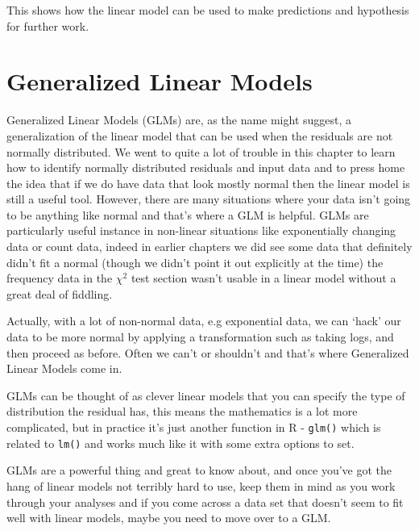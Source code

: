 \documentclass[
]{book}
\newenvironment{sidenote}
{ \begin{tcolorbox}[colbacktitle=blue!50!white,
title=huh?,coltitle=white,
fonttitle=\bfseries] }
{  \end{tcolorbox} }
\begin{document}
This shows how the linear model can be used to make predictions and hypothesis for further work.

\hypertarget{generalized-linear-models}{%
\section{Generalized Linear Models}\label{generalized-linear-models}}

Generalized Linear Models (GLMs) are, as the name might suggest, a generalization of the linear model that can be used when the residuals are not normally distributed. We went to quite a lot of trouble in this chapter to learn how to identify normally distributed residuals and input data and to press home the idea that if we do have data that look mostly normal then the linear model is still a useful tool. However, there are many situations where your data isn't going to be anything like normal and that's where a GLM is helpful. GLMs are particularly useful instance in non-linear situations like exponentially changing data or count data, indeed in earlier chapters we did see some data that definitely didn't fit a normal (though we didn't point it out explicitly at the time) the frequency data in the \(\chi^2\) test section wasn't usable in a linear model without a great deal of fiddling.

\begin{sidenote}
Actually, with a lot of non-normal data, e.g exponential data, we can `hack' our data to be more normal by applying a transformation such as taking logs, and then proceed as before. Often we can't or shouldn't and that's where Generalized Linear Models come in.
\end{sidenote}

GLMs can be thought of as clever linear models that you can specify the type of distribution the residual has, this means the mathematics is a lot more complicated, but in practice it's just another function in R - \texttt{glm()} which is related to \texttt{lm()} and works much like it with some extra options to set.

GLMs are a powerful thing and great to know about, and once you've got the hang of linear models not terribly hard to use, keep them in mind as you work through your analyses and if you come across a data set that doesn't seem to fit well with linear models, maybe you need to move over to a GLM.
\end{document}

